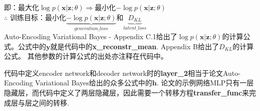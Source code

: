 \documentclass{article}
\begin{document}
即：最大化$\log p(\mathbf{x}|\mathbf{z};\theta) \Rightarrow$最小化$-\log p(\mathbf{x}|\mathbf{z};\theta)$\\

$\therefore$ 训练目标：最小化$\underbrace{-\log p(\mathbf{x}|\mathbf{z};\theta)}_{generation\_loss}$和$\underbrace{D_{KL}}_{latent\_loss}$\\

Auto-Encoding Variational Bayes - Appendix C.1给出了$\log p(\mathbf{x}|\mathbf{z};\theta)$的计算公式。公式中的$\mathbf{y}$就是代码中的\textbf{x\_reconstr\_mean}. Appendix B给出了$D_{KL}$的计算公式。 其他参数的计算公式的出处亦注释在代码中。

代码中定义encoder network和decoder network时的\textbf{layer\_2}相当于论文Auto-Encoding Variational Bayes给出的众多公式中的$\mathbf{h}$. 论文的示例网络MLP只有一层隐藏层，而代码中定义了两层隐藏层，因此需要一个转移方程\textbf{transfer\_func}来完成层与层之间的转移.
\end{document}
